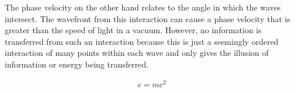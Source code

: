 \documentclass[8pt,a4paper,oneside]{article}
\begin{document}
The phase velocity on the other hand relates to the angle in which the waves intersect. The wavefront from this interaction can cause a phase velocity that is greater than the speed of light in a vacuum. However, no information is transferred from such an interaction because this is just a seemingly ordered interaction of many points within each wave and only gives the illusion of information or energy being transferred. 

\begin{align}
e = mc^2
\end{align}
\end{document}
